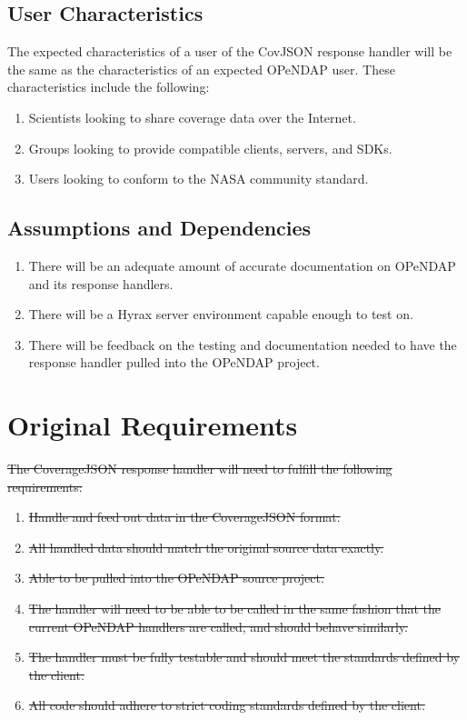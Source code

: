 \documentclass[onecolumn, draftclsnofoot,10pt, compsoc]{IEEEtran}
\begin{document}
\subsection{User Characteristics}
The expected characteristics of a user of the CovJSON response handler will be the same as the characteristics of an expected OPeNDAP user. These characteristics include the following:
\begin{enumerate}
\item Scientists looking to share coverage data over the Internet.
\item Groups looking to provide compatible clients, servers, and SDKs.
\item Users looking to conform to the NASA community standard.

\end{enumerate}

\subsection{Assumptions and Dependencies}
\begin{enumerate}
\item There will be an adequate amount of accurate documentation on OPeNDAP and its response handlers.
\item There will be a Hyrax server environment capable enough to test on.
\item There will be feedback on the testing and documentation needed to have the response handler pulled into the OPeNDAP project.
\end{enumerate}

\section{Original Requirements}
\sout{The CoverageJSON response handler will need to fulfill the following requirements:}
\begin{enumerate}
\item \sout{Handle and feed out data in the CoverageJSON format.}
\item \sout{All handled data should match the original source data exactly.}
\item \sout{Able to be pulled into the OPeNDAP source project.}
\item \sout{The handler will need to be able to be called in the same fashion that the current OPeNDAP handlers are called, and should behave similarly.}
\item \sout{The handler must be fully testable and should meet the standards defined by the client.}
\item \sout{All code should adhere to strict coding standards defined by the client.}
\end{enumerate}
\end{document}
